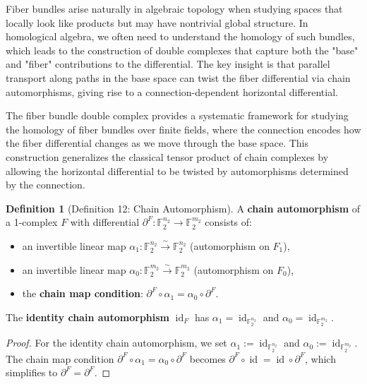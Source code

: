 \documentclass[11pt]{article}
\theoremstyle{plain}
\theoremstyle{definition}
\newtheorem*{definition}{Definition}
\theoremstyle{remark}
\begin{document}
Fiber bundles arise naturally in algebraic topology when studying spaces that locally look like products but may have nontrivial global structure. In homological algebra, we often need to understand the homology of such bundles, which leads to the construction of double complexes that capture both the "base" and "fiber" contributions to the differential. The key insight is that parallel transport along paths in the base space can twist the fiber differential via chain automorphisms, giving rise to a connection-dependent horizontal differential.

The fiber bundle double complex provides a systematic framework for studying the homology of fiber bundles over finite fields, where the connection encodes how the fiber differential changes as we move through the base space. This construction generalizes the classical tensor product of chain complexes by allowing the horizontal differential to be twisted by automorphisms determined by the connection.

\begin{definition}[Definition 12: Chain Automorphism]
A \textbf{chain automorphism} of a 1-complex $F$ with differential $\partial^F : \mathbb{F}_2^{n_2} \to \mathbb{F}_2^{m_2}$ consists of:
\begin{itemize}
  \item an invertible linear map $\alpha_1 : \mathbb{F}_2^{n_2} \xrightarrow{\sim} \mathbb{F}_2^{n_2}$ (automorphism on $F_1$),
  \item an invertible linear map $\alpha_0 : \mathbb{F}_2^{m_2} \xrightarrow{\sim} \mathbb{F}_2^{m_2}$ (automorphism on $F_0$),
  \item the \textbf{chain map condition}: $\partial^F \circ \alpha_1 = \alpha_0 \circ \partial^F$.
\end{itemize}
The \textbf{identity chain automorphism} $\operatorname{id}_F$ has $\alpha_1 = \operatorname{id}_{\mathbb{F}_2^{n_2}}$ and $\alpha_0 = \operatorname{id}_{\mathbb{F}_2^{m_2}}$.
\end{definition}

\begin{proof}
For the identity chain automorphism, we set $\alpha_1 := \operatorname{id}_{\mathbb{F}_2^{n_2}}$ and $\alpha_0 := \operatorname{id}_{\mathbb{F}_2^{m_2}}$. The chain map condition $\partial^F \circ \alpha_1 = \alpha_0 \circ \partial^F$ becomes $\partial^F \circ \operatorname{id} = \operatorname{id} \circ \partial^F$, which simplifies to $\partial^F = \partial^F$.
\end{proof}
\end{document}
